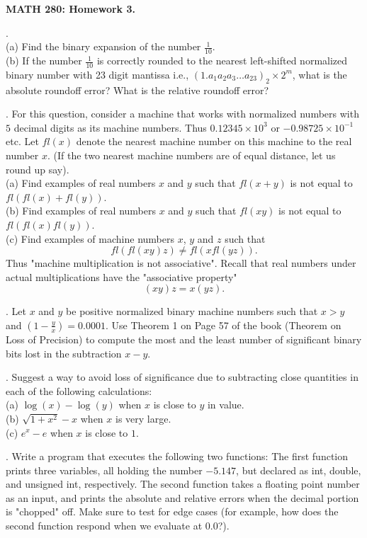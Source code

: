 \documentclass[12 pt]{article}
\begin{document}
\centerline{\bf MATH 280: Homework 3. }

\bigskip

. \\
(a) Find the binary expansion of the number $\frac{1}{10}$. \\
(b) If the number $\frac{1}{10}$ is correctly rounded to the nearest 
left-shifted normalized binary number with 23 digit mantissa i.e., 
$(1.a_1a_2a_3 \dots a_{23})_2 \times 2^m$, what is the absolute 
roundoff error? What is the relative roundoff error?

\medskip

. For this question, consider a machine that works with normalized numbers with
$5$ decimal digits as its machine numbers. Thus $0.12345 \times 10^3$ or
$-0.98725 \times 10^{-1}$ etc. Let $fl(x)$ denote the nearest machine number on this
machine to the real number $x$. (If the two nearest machine numbers are of equal
distance, let us round up say). \\ (a) Find examples of real numbers $x$ and $y$
such that $fl(x+y)$ is not equal to $fl(fl(x)+fl(y))$. \\ (b) Find examples of
real numbers $x$ and $y$ such that $fl(xy)$ is not equal to $fl(fl(x) fl(y))$.
\\ (c) Find examples of machine numbers $x$, $y$ and $z$ such that $$fl(fl(xy)
z) \neq fl(x fl(yz)).$$Thus "machine multiplication is not associative". Recall
that real numbers under actual multiplications have the "associative property"
$$(xy)z=x(yz).$$




\medskip


. Let $x$ and $y$ be positive normalized binary machine numbers such that $x > y$ and $(1-\frac{y}{x}) = 0.0001$. Use Theorem 1 on Page 57 of the book 
(Theorem on Loss of Precision) to compute the most and the least number of significant binary bits lost in the subtraction $x-y$.

\medskip

. Suggest a way to avoid loss of significance due to subtracting close quantities in each of the following calculations: \\
(a) $\log(x)-\log(y)$  when $x$ is close to $y$ in value. \\
(b) $\sqrt{1+x^2} - x$ when $x$ is very large. \\
(c) $e^x - e$ when $x$ is close to $1$. 

\medskip

. Write a program that executes the following two functions: The first function prints three variables, all holding the number $-5.147$, but declared as int, double, and unsigned int, respectively. The second function takes a floating point number as an input, and prints the absolute and relative errors when the decimal portion is "chopped" off. Make sure to test for edge cases (for example, how does the second function respond when we evaluate at $0.0$?). 
 
\end{document}
